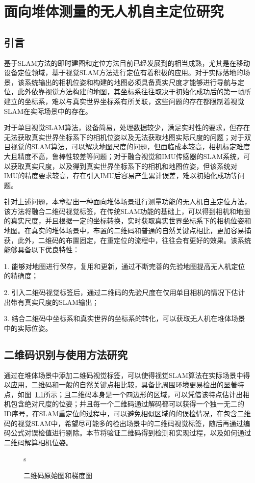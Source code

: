 \chapter{面向堆体测量的无人机自主定位研究}
\label{cha:chap2}
\section{引言}
\label{sec:2.1}
基于SLAM方法的即时建图和定位方法目前已经发展到的相当成熟，尤其是在移动设备定位领域，基于视觉SLAM方法进行定位有着积极的应用。对于实际落地的场景，该系统输出的相机位姿和构建的地图必须具备真实尺度才能够进行导航与定位，此外依靠视觉方法构建的地图，其坐标系往往取决于初始化成功后的第一帧所建立的坐标系，难以与真实世界坐标系有所关联，这些问题的存在都限制着视觉SLAM在实际场景中的存在。

对于单目视觉SLAM算法，设备简易，处理数据较少，满足实时性的要求，但存在无法获取真实世界坐标系下的相机位姿以及无法获取地图实际尺度的问题；对于双目视觉的SLAM算法，可以解决地图尺度的问题，但面临成本较高，相机标定难度大且精度不高，鲁棒性较差等问题；对于融合视觉和IMU传感器的SLAM系统，可以获取真实尺度，以及得到真实世界坐标系下的相机和地图位姿，但该系统对IMU的精度要求较高，存在引入IMU后容易产生累计误差，难以初始化成功等问题。

针对上述问题，本章提出一种面向堆体场景进行测量功能的无人机自主定位方法，该方法将融合二维码视觉标签，在传统SLAM功能的基础上，可以得到相机和地图的真实尺度，并且根据一定的坐标转换，实时获取真实世界坐标系下的相机位姿和地图。在真实的堆体场景中，布置的二维码和普通的自然关键点相比，更加容易捕获，此外，二维码的布置固定，在重定位的流程中，往往会有更好的效果。该系统能够具备以下优良特性：

1. 能够对地图进行保存，复用和更新，通过不断完善的先验地图提高无人机定位的精确度；

2. 引入二维码视觉标签后，通过二维码的先验尺度在仅用单目相机的情况下估计出带有真实尺度的SLAM输出；

3. 结合二维码中坐标系和真实世界的坐标系的转化，可以获取无人机在堆体场景中的实际位姿。
\section{二维码识别与使用方法研究}
\label{sec:2.2}
通过在堆体场景中添加二维码视觉标签，可以使得视觉SLAM算法在实际场景中得以应用，二维码和一般的自然关键点相比较，具备比周围环境更易检出的显著特点，如图~\ref{fig:2VSLAM_MarkerandGradient}所示；且二维码本身是一个四边形的区域，可以凭借该特点估计出相机包含绝对尺度的位姿；并且每一个二维码通过解码都可以获得一个独一无二的ID序号，在SLAM重定位的过程中，可以避免相似区域的的误检情况，在包含二维码的视觉SLAM中，希望尽可能多的检出场景中的二维码视觉标签，随后再通过编码公式对误检值进行剔除。本节将验证二维码得到检测和实现过程，以及如何通过二维码解算相机位姿。
\begin{figure}[H]
  \centering%
  \hspace{1em}%
  s
  \caption{二维码原始图和梯度图}
  \label{fig:2VSLAM_MarkerandGradient}
\end{figure}
